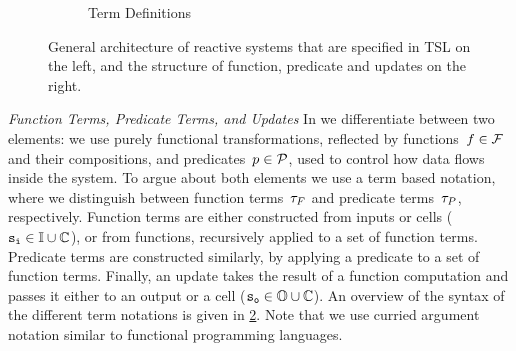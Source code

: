 \begin{figure}[t]
\begin{subfigure}[b]{0.41\textwidth}
  \caption{Term Definitions \mbox{\ }}
  \label{fig:termdefinitions}
\end{subfigure}

\caption{General architecture of reactive systems that are specified in TSL
  on the left, and the structure of function, predicate and updates
  on the right.}
\end{figure}

\medskip

\fussy

\noindent \textit{Function Terms, Predicate Terms, and Updates} In \TSL we
differentiate between two elements: we use purely functional
transformations, reflected by \mbox{functions~$ f \in \mathcal{F} $}
and their compositions, and \mbox{predicates~$ p \in \mathcal{P} $},
used to control how data flows inside the system.
To argue about both
elements we use a term based notation, where we distinguish between
function terms~$ \tau_{F} $ and predicate terms~$ \tau_{P} $,
respectively. Function terms are either constructed from inputs or
cells \mbox{($ {\text{\texttt{s}}}_{{\text{\texttt{i}}}} \in \mathbb{I} \cup \mathbb{C} $)}, or from
functions, recursively applied to a set of function terms. Predicate
terms are constructed similarly, by applying a predicate to a set of
function terms.
%
\sloppy
%
Finally, an update takes the result of a function computation and passes it either to an output
or a cell ($ {\text{\texttt{s}}}_{{\text{\texttt{o}}}} \in \mathbb{O} \cup \mathbb{C} $). An overview of the syntax
of the different term notations is given in \cref{fig:termdefinitions}.
Note that we use curried argument notation similar to functional
programming languages.

